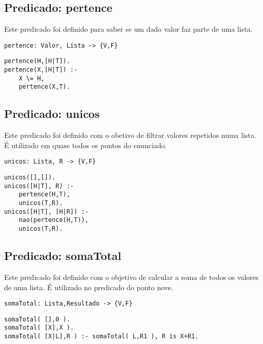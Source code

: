 \documentclass{report}
\begin{document}
\subsection{Predicado: pertence}

Este predicado foi definido para saber se um dado valor faz parte de uma lista.

\begin{verbatim}
pertence: Valor, Lista -> {V,F}
\end{verbatim}

\begin{verbatim}
pertence(H,[H|T]).
pertence(X,[H|T]) :-
    X \= H,
    pertence(X,T).

\end{verbatim}





\subsection{Predicado: unicos}

Este predicado foi definido com o obetivo de filtrar valores repetidos numa lista. É utilizado em quase todos os pontos do enunciado.

\begin{verbatim}
unicos: Lista, R -> {V,F}
\end{verbatim}

\begin{verbatim}
unicos([],[]).
unicos([H|T], R) :-
    pertence(H,T),
    unicos(T,R).
unicos([H|T], [H|R]) :-
    nao(pertence(H,T)),
    unicos(T,R).
\end{verbatim}






\subsection{Predicado: somaTotal}

Este predicado foi definido com o objetivo de calcular a soma de todos os valores de uma lista. É utilizado no predicado do ponto nove.

\begin{verbatim}
somaTotal: Lista,Resultado -> {V,F}
\end{verbatim}

\begin{verbatim}
somaTotal( [],0 ).
somaTotal( [X],X ).
somaTotal( [X|L],R ) :- somaTotal( L,R1 ), R is X+R1.
\end{verbatim}
\end{document}

